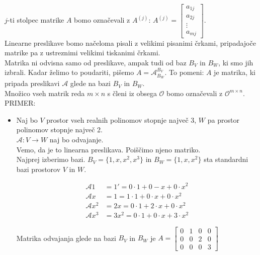 \documentclass[a4paper,12pt]{article}
\begin{document}
$j$-ti stolpec matrike $A$ bomo označevali z $A^{(j)}$: $A^{(j)}=\begin{bmatrix} a_{1j} \\ a_{2j} \\ \vdots \\ a_{mj} \end{bmatrix}$.\\
	
Linearne preslikave bomo načeloma pisali z velikimi pisanimi črkami, pripadajoče matrike pa z ustreznimi velikimi tiskanimi črkami. \\

Matrika ni odvisna samo od preslikave, ampak tudi od baz $B_V$ in $B_W$, ki smo jih izbrali. Kadar želimo to poudariti, pišemo $A=\mathcal{A}_{B_W}^{B_V}$. To pomeni: $A$ je matrika, ki pripada preslikavi $\mathcal{A}$ glede na bazi $B_V$ in $B_W$. \\

Množico vseh matrik reda $m\times n$ s členi iz obsega $\mathcal{O}$ bomo označevali z $\mathcal{O}^{m\times n}$. \\

PRIMER:
\begin{itemize}
	\item Naj bo $V$ prostor vseh realnih polinomov stopnje največ 3, $W$ pa prostor polinomov stopnje največ 2. \\
	
	$\mathcal{A}:V\to W$ naj bo odvajanje. \\

	Vemo, da je to linearna preslikava. Poiščimo njeno matriko.\\

	Najprej izberimo bazi. $B_V=\{1,x,x^2,x^3\}$ in $B_W=\{1,x,x^2\}$ sta standardni bazi prostorov $V$ in $W$. 

\begin{align*}
	\mathcal{A}1&=1'=0\cdot 1+0-x+0\cdot x^2 \\
	\mathcal{A}x&=1=1\cdot 1 +0\cdot x+0\cdot x^2 \\
	\mathcal{A}x^2&=2x=0\cdot 1 +2\cdot x + 0 \cdot x^2 \\
	\mathcal{A}x^3&=3x^2=0\cdot 1+0\cdot x+3\cdot x^2
\end{align*}

Matrika odvajanja glede na bazi $B_V$ in $B_W$ je 
$A=
\begin{bmatrix}
	0&1&0&0\\
	0&0&2&0\\
	0&0&0&3
\end{bmatrix}$
\end{itemize}
\end{document}
